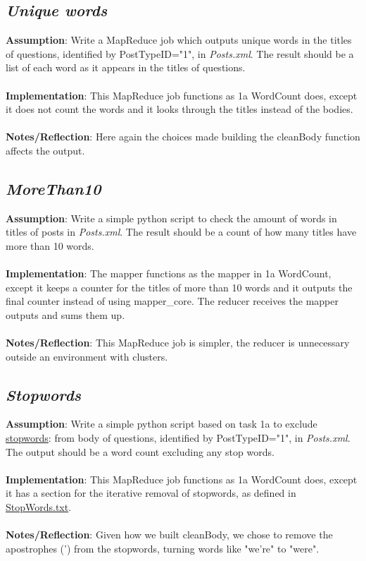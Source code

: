\documentclass[fleqn,10pt]{wlscirep}
\begin{document}
\subsection{\emph{Unique words}}
\textbf{Assumption}: Write a MapReduce job which outputs unique words in the titles of questions, identified by PostTypeID="1", in \textit{Posts.xml}. The result should be a list of each word as it appears in the titles of questions. \\ \\
\textbf{Implementation}: This MapReduce job functions as 1a WordCount does, except it does not count the words and it looks through the titles instead of the bodies. \\ \\
\textbf{Notes/Reflection}: Here again the choices made building the cleanBody function affects the output.


\subsection{\emph{MoreThan10}}
\textbf{Assumption}: Write a simple python script to check the amount of words in titles of posts in \textit{Posts.xml}. The result should be a count of how many titles have more than 10 words. \\ \\
\textbf{Implementation}: The mapper functions as the mapper in 1a WordCount, except it keeps a counter for the titles of more than 10 words and it outputs the final counter instead of using mapper\_core.
The reducer receives the mapper outputs and sums them up. \\ \\
\textbf{Notes/Reflection}: This MapReduce job is simpler, the reducer is unnecessary outside an environment with clusters.


\subsection{\emph{Stopwords}}
\textbf{Assumption}: Write a simple python script based on task 1a to exclude \href{https://raw.githubusercontent.com/naimdjon/stopwords/master/stopwords.txt}{stopwords}: from body of questions, identified by PostTypeID="1", in \textit{Posts.xml}. The output should be a word count excluding any stop words. \\ \\
\textbf{Implementation}: This MapReduce job functions as 1a WordCount does, except it has a section for the iterative removal of stopwords, as defined in \href{https://raw.githubusercontent.com/naimdjon/stopwords/master/stopwords.txt}{StopWords.txt}. \\ \\
\textbf{Notes/Reflection}: Given how we built cleanBody, we chose to remove the apostrophes (') from the stopwords, turning words like "we're" to "were".

\end{document}
